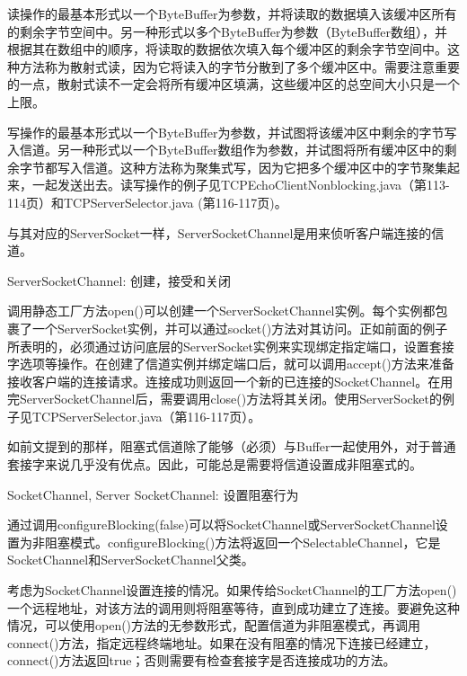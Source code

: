 	读操作的最基本形式以一个ByteBuffer为参数，并将读取的数据填入该缓冲区所有的剩余字节空间中。另一种形式以多个ByteBuffer为参数（ByteBuffer数组），并根据其在数组中的顺序，将读取的数据依次填入每个缓冲区的剩余字节空间中。这种方法称为散射式读，因为它将读入的字节分散到了多个缓冲区中。需要注意重要的一点，散射式读不一定会将所有缓冲区填满，这些缓冲区的总空间大小只是一个上限。 

	写操作的最基本形式以一个ByteBuffer为参数，并试图将该缓冲区中剩余的字节写入信道。另一种形式以一个ByteBuffer数组作为参数，并试图将所有缓冲区中的剩余字节都写入信道。这种方法称为聚集式写，因为它把多个缓冲区中的字节聚集起来，一起发送出去。读写操作的例子见TCPEchoClientNonblocking.java（第113-114页）和TCPServerSelector.java (第116-117页)。 

	与其对应的ServerSocket一样，ServerSocketChannel是用来侦听客户端连接的信道。 

	ServerSocketChannel: 创建，接受和关闭 

	

	调用静态工厂方法open()可以创建一个ServerSocketChannel实例。每个实例都包裹了一个ServerSocket实例，并可以通过socket()方法对其访问。正如前面的例子所表明的，必须通过访问底层的ServerSocket实例来实现绑定指定端口，设置套接字选项等操作。在创建了信道实例并绑定端口后，就可以调用accept()方法来准备接收客户端的连接请求。连接成功则返回一个新的已连接的SocketChannel。在用完ServerSocketChannel后，需要调用close()方法将其关闭。使用ServerSocket的例子见TCPServerSelector.java（第116-117页）。 

	如前文提到的那样，阻塞式信道除了能够（必须）与Buffer一起使用外，对于普通套接字来说几乎没有优点。因此，可能总是需要将信道设置成非阻塞式的。 

	SocketChannel, Server SocketChannel: 设置阻塞行为 

	

	通过调用configureBlocking(false)可以将SocketChannel或ServerSocketChannel设置为非阻塞模式。configureBlocking()方法将返回一个SelectableChannel，它是SocketChannel和ServerSocketChannel父类。 

	考虑为SocketChannel设置连接的情况。如果传给SocketChannel的工厂方法open()一个远程地址，对该方法的调用则将阻塞等待，直到成功建立了连接。要避免这种情况，可以使用open()方法的无参数形式，配置信道为非阻塞模式，再调用connect()方法，指定远程终端地址。如果在没有阻塞的情况下连接已经建立，connect()方法返回true；否则需要有检查套接字是否连接成功的方法。 

